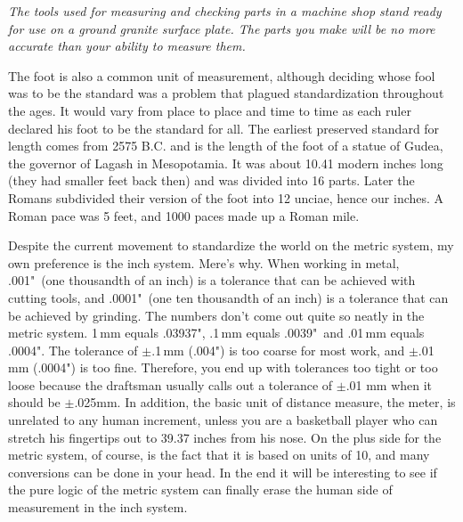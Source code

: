 \bigskip
\textit{The tools used for measuring and checking parts in a machine shop stand
ready for use on a ground granite surface plate. The parts you make will be no
more accurate than your ability to measure them.}
\bigskip

The foot is also a common unit of measurement, although deciding whose fool was
to be the standard was a problem that plagued standardization throughout the
ages. It would vary from place to place and time to time as each ruler declared
his foot to be the standard for all. The earliest preserved standard for length
comes from 2575 B.C. and is the length of the foot of a statue of Gudea, the
governor of Lagash in Mesopotamia. It was about 10.41 modern inches long (they
had smaller feet back then) and was divided into 16 parts. Later the Romans
subdivided their version of the foot into 12 unciae, hence our inches. A Roman
pace was 5 feet, and 1000 paces made up a Roman mile.

Despite the current movement to standardize the world on the metric system, my
own preference is the inch system. Mere's why. When working in metal, .001"\ (one
thousandth of an inch) is a tolerance that can be achieved with cutting tools,
and .0001"\ (one ten thousandth of an inch) is a tolerance that can be achieved
by grinding. The numbers don't come out quite so neatly in the metric system.
1\,mm equals .03937", .1\,mm equals .0039"\ and .01\,mm equals .0004". The
tolerance of $\pm$.1\,mm (.004") is too coarse for most work, and $\pm$.01\,mm
(.0004") is too fine. Therefore, you end up with tolerances too tight or too
loose because the draftsman usually calls out a tolerance of $\pm$.01 mm when it
should be $\pm$.025mm. In addition, the basic unit of distance measure, the meter,
is unrelated to any human increment, unless you are a basketball player who can
stretch his fingertips out to 39.37 inches from his nose. On the plus side for
the metric system, of course, is the fact that it is based on units of 10, and
many conversions can be done in your head. In the end it will be interesting to
see if the pure logic of the metric system can finally erase the human side of
measurement in the inch system.


